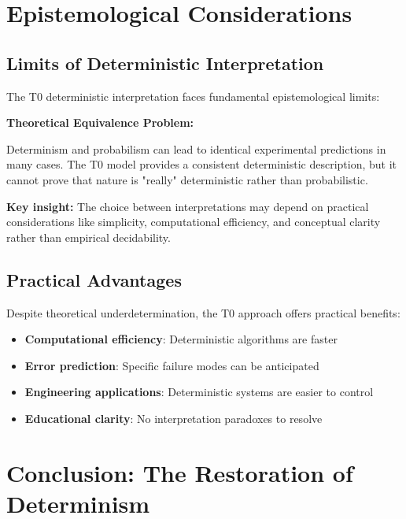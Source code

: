 \documentclass[12pt,a4paper]{report}
\begin{document}
\section{Epistemological Considerations}
\label{sec:epistemological}

\subsection{Limits of Deterministic Interpretation}
\label{subsec:limits_deterministic}

The T0 deterministic interpretation faces fundamental epistemological limits:

\begin{tcolorbox}[colback=yellow!5!white,colframe=orange!75!black,title=Epistemological Caveat]
	\textbf{Theoretical Equivalence Problem:}
	
	Determinism and probabilism can lead to identical experimental predictions in many cases. The T0 model provides a consistent deterministic description, but it cannot prove that nature is "really" deterministic rather than probabilistic.
	
	\textbf{Key insight:} The choice between interpretations may depend on practical considerations like simplicity, computational efficiency, and conceptual clarity rather than empirical decidability.
\end{tcolorbox}


\subsection{Practical Advantages}
\label{subsec:practical_advantages}

Despite theoretical underdetermination, the T0 approach offers practical benefits:

\begin{itemize}
	\item \textbf{Computational efficiency}: Deterministic algorithms are faster
	\item \textbf{Error prediction}: Specific failure modes can be anticipated
	\item \textbf{Engineering applications}: Deterministic systems are easier to control
	\item \textbf{Educational clarity}: No interpretation paradoxes to resolve
\end{itemize}

\section{Conclusion: The Restoration of Determinism}
\label{sec:conclusion_determinism}
\end{document}
